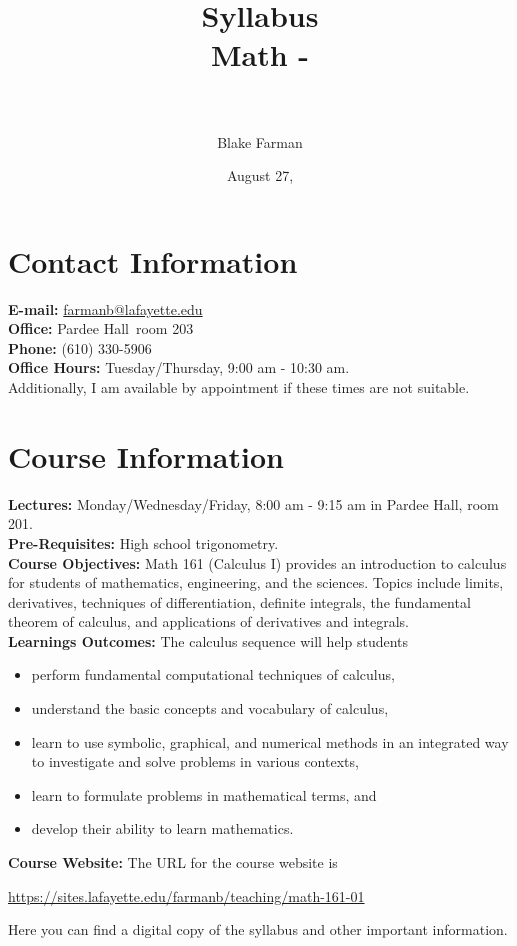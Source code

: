 \documentclass[10pt]{amsart}
\author[Blake Farman]{Blake Farman\\ \school}
\title[Math \course-\courseSection]{Syllabus\\Math \course-\courseSection \\ \semester\ \year}
\date{August 27, \year}
\def\building{Pardee Hall}
\def\officeNumber{203}
\def\courseWebsite{https://sites.lafayette.edu/farmanb/teaching/math-161-01}
\begin{document}
\maketitle

\section*{Contact Information}
\noindent
\textbf{E-mail:} \href{mailto:farmanb@lafayette.edu}{farmanb@lafayette.edu}\\
\textbf{Office:} \building\ room \officeNumber\\
\textbf{Phone:} (610) 330-5906\\
\textbf{Office Hours:} Tuesday/Thursday, 9:00 am - 10:30 am.\\
Additionally, I am available by appointment if these times are not suitable.

\section*{Course Information}
\noindent
\textbf{Lectures:}
Monday/Wednesday/Friday,  8:00 am - 9:15 am in Pardee Hall, room 201.\\

\noindent\textbf{Pre-Requisites:} High school trigonometry.\\

\noindent\textbf{Course Objectives:}
Math 161 (Calculus I) provides an introduction to calculus for students of mathematics, engineering, and the sciences. Topics include limits, derivatives, techniques of differentiation, definite integrals, the fundamental theorem of calculus, and applications of derivatives and integrals.\\

\noindent\textbf{Learnings Outcomes:}
The calculus sequence will help students
\begin{itemize}
\item
  perform fundamental computational techniques of calculus,
\item
  understand the basic concepts and vocabulary of calculus,
\item
  learn to use symbolic, graphical, and numerical methods in an integrated way to investigate and solve problems in various contexts,
\item
  learn to formulate problems in mathematical terms, and
\item
  develop their ability to learn mathematics.
\end{itemize}
\noindent\textbf{Course Website:} The URL for the course website is
\begin{center}
  \url{\courseWebsite}
\end{center}
Here you can find a digital copy of the syllabus and other important information.\\
\end{document}
